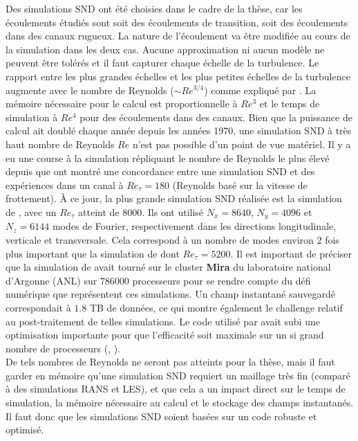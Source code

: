Des simulations SND ont été choisies dans le cadre de la thèse, car les écoulements étudiés sont soit des écoulements de transition, soit des écoulements dans des canaux rugueux. La nature de l'écoulement va être modifiée au cours de la simulation dans les deux cas. Aucune approximation ni aucun modèle ne peuvent être tolérés et il faut capturer chaque échelle de la turbulence. Le rapport entre les plus grandes échelles et les plus petites échelles de la turbulence augmente avec le nombre de Reynolds ($\sim Re^{3/4}$) comme expliqué par \cite{pope2000}. La mémoire nécessaire pour le calcul est proportionnelle à $Re^{3}$ et le temps de simulation à $Re^{4}$ pour des écoulements dans des canaux. Bien que la puissance de calcul ait doublé chaque année depuis les années 1970, une simulation SND à très haut nombre de Reynolds $Re$ n'est pas possible d'un point de vue matériel. Il y a eu une course à la simulation répliquant le nombre de Reynolds le plus élevé depuis que \citet{Kim1987} ont montré une concordance entre une simulation SND et des expériences dans un canal à $Re_{\tau}=180$ (Reynolds basé sur la vitesse de frottement). À ce jour, la plus grande simulation SND réalisée est la simulation de \citet{Yamamoto2018}, avec un $Re_{\tau}$ atteint de $8000$. Ils ont utilisé $N_{x}=8640$, $N_{y}=4096$ et $N_{z}=6144$ modes de Fourier, respectivement dans les directions longitudinale, verticale et transversale. Cela correspond à un nombre de modes environ $2$ fois plus important que la simulation de \citet{Lee2015} dont $Re_{\tau}=5200$. Il est important de préciser que la simulation de \citet{Lee2015} avait tourné sur le cluster \textbf{Mira} du laboratoire national d'Argonne (ANL) sur $786000$ processeurs pour se rendre compte du défi numérique que représentent ces simulations. Un champ instantané sauvegardé correspondait à $1.8$ TB de données, ce qui montre également le challenge relatif au post-traitement de telles simulations. Le code utilisé par \citet{Lee2015} avait subi une optimisation importante pour que l'efficacité soit maximale sur un si grand nombre de processeurs (\cite{Lee2013}, \cite{Lee2014}).\\

De tels nombres de Reynolds ne seront pas atteints pour la thèse, mais il faut garder en mémoire qu'une simulation SND requiert un maillage très fin (comparé à des simulations RANS et LES), et que cela a un impact direct sur le temps de simulation, la mémoire nécessaire au calcul et le stockage des champs instantanés. Il faut donc que les simulations SND soient basées sur un code robuste et optimisé.\\

